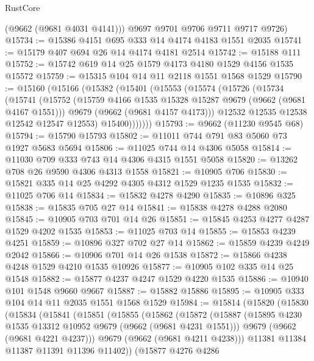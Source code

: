 \begin{lexlean}{RustCore}
\begin{coremodule}
        (@9662 (@9681 @4031 @4141)))
      @9697
      @9701
      @9706
      @9711
      @9717
      @9726)
@15734 := @15386 @4151 @695 @333 @14 @4174 @4183 @1551 @2035
@15741 := @15179 @407 @694 @26 @14 @4174 @4181 @2514
@15742 := @15188 @111
@15752 := @15742 @619 @14 @25 @1579 @4173 @4180 @1529 @4156 @1535 @15572
@15759 := @15315 @104 @14 @11 @2118 @1551 @1568 @1529
@15790 := @15160
    (@15166
      (@15382
        (@15401
          (@15553
            (@15574
              (@15726
                (@15734
                  (@15741
                    (@15752
                      (@15759 @4166 @1535 @15328 @15287 @9679 (@9662 (@9681 @4167 @1551)))
                      @9679
                      (@9662 (@9681 @4157 @4173)))
                    @12532
                    @12535
                    @12538
                    @12542
                    @12547
                    @12553)
                  @15400)))))))
@15793 := @9662 (@11230 @9545 @68)
@15794 := @15790 @15793
@15802 := @11011 @744 @791 @83 @5060 @73 @1927 @5683 @5694
@15806 := @11025 @744 @14 @4306 @5058
@15814 := @11030 @709 @333 @743 @14 @4306 @4315 @1551 @5058
@15820 := @13262 @708 @26 @9590 @4306 @4313 @1558
@15821 := @10905 @706
@15830 := @15821 @335 @14 @25 @4292 @4305 @4312 @1529 @1235 @1535
@15832 := @11025 @706 @14
@15834 := @15832 @4278 @4290
@15835 := @10896 @325
@15838 := @15835 @705 @27 @14
@15841 := @15838 @4278 @4288 @2080
@15845 := @10905 @703 @701 @14 @26
@15851 := @15845 @4253 @4277 @4287 @1529 @4202 @1535
@15853 := @11025 @703 @14
@15855 := @15853 @4239 @4251
@15859 := @10896 @327 @702 @27 @14
@15862 := @15859 @4239 @4249 @2042
@15866 := @10906 @701 @14 @26 @1538
@15872 := @15866 @4238 @4248 @1529 @4210 @1535 @10926
@15877 := @10905 @102 @335 @14 @25 @1548
@15882 := @15877 @4237 @4247 @1529 @4220 @1535
@15886 := @10940 @101 @1548 @9660 @9667
@15887 := @15882 @15886
@15895 := @10905 @333 @104 @14 @11 @2035 @1551 @1568 @1529
@15984 := @15814
    (@15820
      (@15830
        (@15834
          (@15841
            (@15851
              (@15855
                (@15862
                  (@15872
                    (@15887
                      (@15895 @4230 @1535 @13312 @10952 @9679 (@9662 (@9681 @4231 @1551)))
                      @9679
                      (@9662 (@9681 @4221 @4237)))
                    @9679
                    (@9662 (@9681 @4211 @4238)))
                  @11381
                  @11384
                  @11387
                  @11391
                  @11396
                  @11402))
              (@15877
                @4276
                @4286

\end{coremodule}
\end{lexlean}
